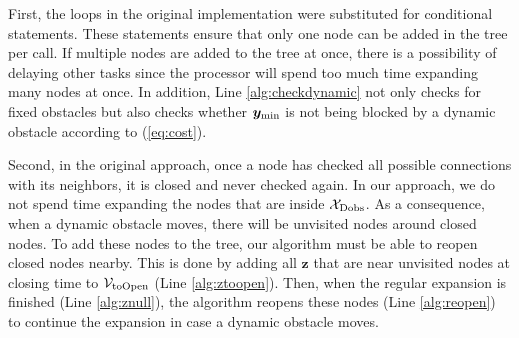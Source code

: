 First, the loops in the original implementation were substituted for conditional statements. These statements ensure that only one node can be added in the tree per call. If multiple nodes are added to the tree at once, there is a possibility of delaying other tasks since the processor will spend too much time expanding many nodes at once. In addition, Line \ref{alg:checkdynamic} not only checks for fixed obstacles but also checks whether $\bm y_{\rm min}$ is not being blocked by a dynamic obstacle according to (\ref{eq:cost}). 

Second, in the original approach, once a node has checked all possible connections with its neighbors, it is closed and never checked again. In our approach, we do not spend time expanding the nodes that are inside $\mathcal{X}_{\rm Dobs}$. As a consequence, when a dynamic obstacle moves, there will be unvisited nodes around closed nodes. To add these nodes to the tree, our algorithm must be able to reopen closed nodes nearby. This is done by adding all $\bm z$ that are near unvisited nodes at closing time to $\mathcal{V}_{\rm toOpen}$ (Line \ref{alg:ztoopen}). Then, when the regular expansion is finished (Line \ref{alg:znull}), the algorithm reopens these nodes (Line \ref{alg:reopen}) to continue the expansion in case a dynamic obstacle moves.

